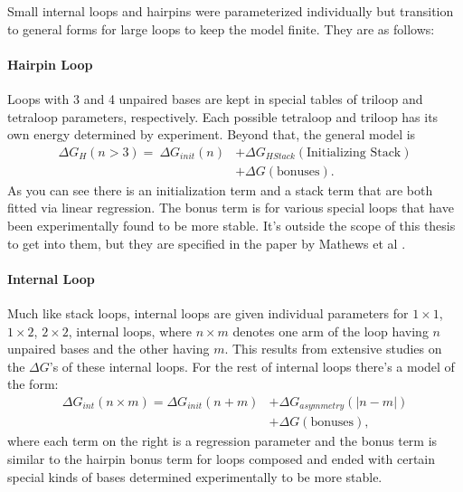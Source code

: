 Small internal loops and hairpins were parameterized individually but
transition to general forms for large loops to keep the model
finite. They are as follows:

\paragraph{Hairpin Loop} 
Loops with 3 and 4 unpaired bases are kept in special tables of
triloop and tetraloop parameters, respectively. Each possible
tetraloop and triloop has its own energy determined by
experiment. Beyond that, the general model is 
\begin{equation}
\begin{split}
\Delta G_H(n > 3) =  \  \Delta G_{init}(n) &+ \Delta
G_{HStack} (\text{Initializing Stack}) \\
&+ \Delta G (\text{bonuses}).
\end{split}
\end{equation}
As you can see there is an initialization term and a stack term that
are both fitted via linear regression. The bonus term is for various
special loops that have been experimentally found to be more
stable. It's outside the scope of this thesis to get into them, but
they are specified in the paper by Mathews et al \cite{mathews1999expanded}.

\paragraph{Internal Loop}
Much like stack loops, internal loops are given individual parameters
for $1 \times 1$, $1 \times 2$, $2 \times 2$, internal loops, where $n
\times m$ denotes one arm of the loop having $n$ unpaired bases and
the other having $m$. This results from extensive studies on the
$\Delta G$'s of these internal loops. For the rest of internal loops
there's a model of the form:
\begin{equation}
\begin{split}
 \Delta G_{int} ( n \times m ) = \Delta G_{init} (n + m) &+ \Delta G_{asymmetry} (| n - m |) \\
& + \Delta G ( \text{bonuses}),
\end{split}
\end{equation}
where each term on the right is a regression parameter and the bonus
term is similar to the hairpin bonus term for loops composed and ended
with certain special kinds of bases determined experimentally to be
more stable.

